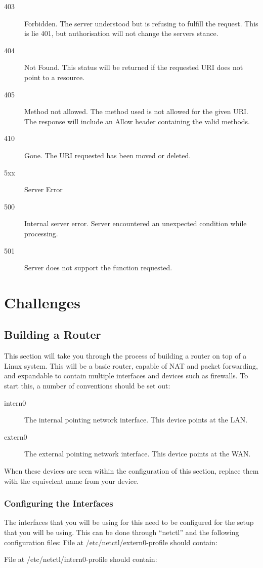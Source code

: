 \begin{description}
			\item[403] Forbidden.
				The server understood but is refusing to fulfill the request.
				This is lie 401, but authorisation will not change the servers stance.
			\item[404] Not Found.
				This status will be returned if the requested URI does not point to a resource.
			\item[405] Method not allowed.
				The method used is not allowed for the given URI.
				The response will include an Allow header containing the valid methods.
			\item[410] Gone.
				The URI requested has been moved or deleted.
			\item[5xx] Server Error
			\item[500] Internal server error.
				Server encountered an unexpected condition while processing.
			\item[501] Server does not support the function requested.
		\end{description}
	\section{Challenges}
		\subsection{Building a Router}
			This section will take you through the process of building a router on top of a Linux system.
			This will be a basic router, capable of NAT and packet forwarding, and expandable to contain multiple interfaces and devices such as firewalls.
			To start this, a number of conventions should be set out:
			\begin{description}
				\item[intern0] The internal pointing network interface.
					This device points at the LAN.
				\item[extern0] The external pointing network interface.
					This device points at the WAN.
			\end{description}
			When these devices are seen within the configuration of this section, replace them with the equivelent name from your device.

			\subsubsection{Configuring the Interfaces}
				The interfaces that you will be using for this need to be configured for the setup that you will be using.
				This can be done through ``netctl'' and the following configuration files:
				File at /etc/netctl/extern0-profile should contain:
				
				File at /etc/netctl/intern0-profile should contain:
				


